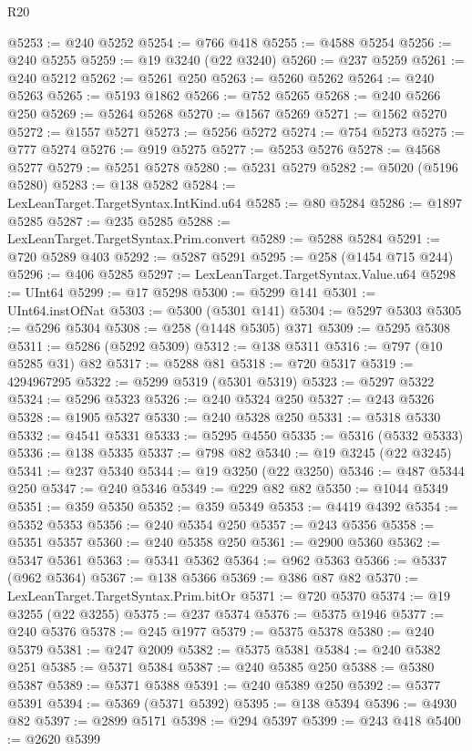 \begin{lexlean}{R20}
\begin{coremodule}
{@5253 := @240 @5252
@5254 := @766 @418
@5255 := @4588 @5254
@5256 := @240 @5255
@5259 := @19 @3240 (@22 @3240)
@5260 := @237 @5259
@5261 := @240 @5212
@5262 := @5261 @250
@5263 := @5260 @5262
@5264 := @240 @5263
@5265 := @5193 @1862
@5266 := @752 @5265
@5268 := @240 @5266 @250
@5269 := @5264 @5268
@5270 := @1567 @5269
@5271 := @1562 @5270
@5272 := @1557 @5271
@5273 := @5256 @5272
@5274 := @754 @5273
@5275 := @777 @5274
@5276 := @919 @5275
@5277 := @5253 @5276
@5278 := @4568 @5277
@5279 := @5251 @5278
@5280 := @5231 @5279
@5282 := @5020 (@5196 @5280)
@5283 := @138 @5282
@5284 := LexLeanTarget.TargetSyntax.IntKind.u64
@5285 := @80 @5284
@5286 := @1897 @5285
@5287 := @235 @5285
@5288 := LexLeanTarget.TargetSyntax.Prim.convert
@5289 := @5288 @5284
@5291 := @720 @5289 @403
@5292 := @5287 @5291
@5295 := @258 (@1454 @715 @244)
@5296 := @406 @5285
@5297 := LexLeanTarget.TargetSyntax.Value.u64
@5298 := UInt64
@5299 := @17 @5298
@5300 := @5299 @141
@5301 := UInt64.instOfNat
@5303 := @5300 (@5301 @141)
@5304 := @5297 @5303
@5305 := @5296 @5304
@5308 := @258 (@1448 @5305) @371
@5309 := @5295 @5308
@5311 := @5286 (@5292 @5309)
@5312 := @138 @5311
@5316 := @797 (@10 @5285 @31) @82
@5317 := @5288 @81
@5318 := @720 @5317
@5319 := 4294967295
@5322 := @5299 @5319 (@5301 @5319)
@5323 := @5297 @5322
@5324 := @5296 @5323
@5326 := @240 @5324 @250
@5327 := @243 @5326
@5328 := @1905 @5327
@5330 := @240 @5328 @250
@5331 := @5318 @5330
@5332 := @4541 @5331
@5333 := @5295 @4550
@5335 := @5316 (@5332 @5333)
@5336 := @138 @5335
@5337 := @798 @82
@5340 := @19 @3245 (@22 @3245)
@5341 := @237 @5340
@5344 := @19 @3250 (@22 @3250)
@5346 := @487 @5344 @250
@5347 := @240 @5346
@5349 := @229 @82 @82
@5350 := @1044 @5349
@5351 := @359 @5350
@5352 := @359 @5349
@5353 := @4419 @4392
@5354 := @5352 @5353
@5356 := @240 @5354 @250
@5357 := @243 @5356
@5358 := @5351 @5357
@5360 := @240 @5358 @250
@5361 := @2900 @5360
@5362 := @5347 @5361
@5363 := @5341 @5362
@5364 := @962 @5363
@5366 := @5337 (@962 @5364)
@5367 := @138 @5366
@5369 := @386 @87 @82
@5370 := LexLeanTarget.TargetSyntax.Prim.bitOr
@5371 := @720 @5370
@5374 := @19 @3255 (@22 @3255)
@5375 := @237 @5374
@5376 := @5375 @1946
@5377 := @240 @5376
@5378 := @245 @1977
@5379 := @5375 @5378
@5380 := @240 @5379
@5381 := @247 @2009
@5382 := @5375 @5381
@5384 := @240 @5382 @251
@5385 := @5371 @5384
@5387 := @240 @5385 @250
@5388 := @5380 @5387
@5389 := @5371 @5388
@5391 := @240 @5389 @250
@5392 := @5377 @5391
@5394 := @5369 (@5371 @5392)
@5395 := @138 @5394
@5396 := @4930 @82
@5397 := @2899 @5171
@5398 := @294 @5397
@5399 := @243 @418
@5400 := @2620 @5399
}
\end{coremodule}
\end{lexlean}
